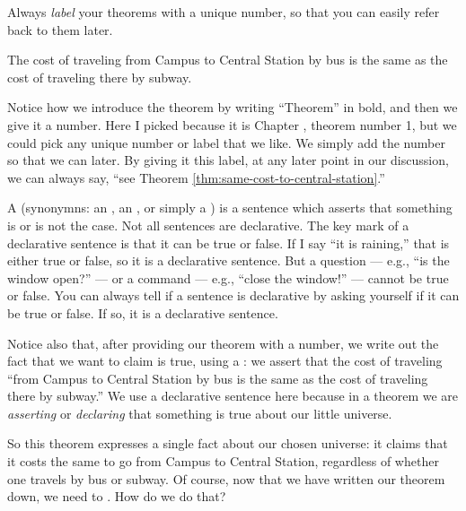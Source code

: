 \documentclass[../../../main.tex]{subfiles}
\begin{document}
\begin{aside}
  \begin{remark}
    Always \emph{label} your theorems with a unique number, so that you can easily refer back to them later.
  \end{remark}
\end{aside}

\begin{framed}
  \begin{theorem} 
    \label{thm:same-cost-to-central-station}
    The cost of traveling from Campus to Central Station by bus is the same as the cost of traveling there by subway.
  \end{theorem}
\end{framed}

\noindent
Notice how we introduce the theorem by writing ``Theorem'' in bold, and then we give it a number. Here I picked \thetheorem because it is Chapter \thechapter, theorem number 1, but we could pick any unique number or label that we like. We simply add the number so that we can  later. By giving it this label, at any later point in our discussion, we can always say, ``see Theorem \ref{thm:same-cost-to-central-station}.'' 

\begin{terminology}
  A  (synonymns: an , an , or simply a ) is a sentence which asserts that something is or is not the case. Not all sentences are declarative. The key mark of a declarative sentence is that it can be true or false. If I say ``it is raining,'' that is either true or false, so it is a declarative sentence. But a question --- e.g., ``is the window open?'' --- or a command --- e.g., ``close the window!'' --- cannot be true or false. You can always tell if a sentence is declarative by asking yourself if it can be true or false. If so, it is a declarative sentence.
\end{terminology}

Notice also that, after providing our theorem  with a number, we write out the fact that we want to claim is true, using a : we assert that the cost of traveling ``from Campus to Central Station by bus is the same as the cost of traveling there by subway.'' We use a declarative sentence here because in a theorem we are \emph{asserting} or \emph{declaring} that something is true about our little universe.

So this theorem expresses a single fact about our chosen universe: it claims that it costs the same to go from Campus to Central Station, regardless of whether one travels by bus or subway. Of course, now that we have written our theorem down, we need to . How do we do that? 
\end{document}
